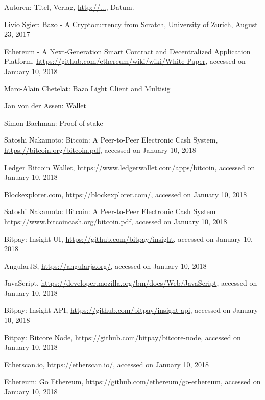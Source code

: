 \begin{thebibliography}{99}

 Autoren: Titel, Verlag, \url{http://...}, Datum.

 Livio Sgier: Bazo - A Cryptocurrency from Scratch, University of Zurich, August 23, 2017

 Ethereum - A Next-Generation Smart Contract and Decentralized Application Platform, \url{https://github.com/ethereum/wiki/wiki/White-Paper}, accessed on January 10, 2018

 Marc-Alain Chetelat: Bazo Light Client and Multisig

 Jan von der Assen: Wallet

 Simon Bachman: Proof of stake

 Satoshi Nakamoto: Bitcoin: A Peer-to-Peer Electronic Cash System, \url{https://bitcoin.org/bitcoin.pdf}, accessed on January 10, 2018

 Ledger Bitcoin Wallet, \url{https://www.ledgerwallet.com/apps/bitcoin}, accessed on January 10, 2018

 Blockexplorer.com, \url{https://blockexplorer.com/}, accessed on January 10, 2018

 Satoshi Nakamoto: Bitcoin: A Peer-to-Peer Electronic Cash System \url{https://www.bitcoincash.org/bitcoin.pdf}, accessed on January 10, 2018

 Bitpay: Insight UI, \url{https://github.com/bitpay/insight}, accessed on January 10, 2018

 AngularJS, \url{https://angularjs.org/}, accessed on January 10, 2018

 JavaScript, \url{https://developer.mozilla.org/bm/docs/Web/JavaScript}, accessed on January 10, 2018

 Bitpay: Insight API, \url{https://github.com/bitpay/insight-api}, accessed on January 10, 2018

 Bitpay: Bitcore Node, \url{https://github.com/bitpay/bitcore-node}, accessed on January 10, 2018

 Etherscan.io, \url{https://etherscan.io/}, accessed on January 10, 2018

 Ethereum: Go Ethereum, \url{https://github.com/ethereum/go-ethereum}, accessed on January 10, 2018


\end{thebibliography}
